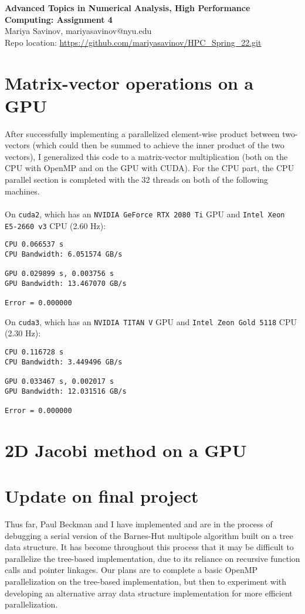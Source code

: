 \documentclass[10pt, letterpaper]{article}
\begin{document}
\begin{center}
{\bf
Advanced Topics in Numerical Analysis, High Performance Computing: \textbf{Assignment 4} \\
}
Mariya Savinov, mariyasavinov@nyu.edu\\
Repo location: \url{https://github.com/mariyasavinov/HPC_Spring_22.git}
\end{center}

\section{Matrix-vector operations on a GPU}
After successfully implementing a parallelized element-wise product between two-vectors (which could then be summed to achieve the inner product of the two vectors), I generalized this code to a matrix-vector multiplication (both on the CPU with OpenMP and on the GPU with CUDA). For the CPU part, the CPU parallel section is completed with the 32 threads on both of the following machines.\\\\
On {\tt cuda2}, which has an {\tt NVIDIA GeForce RTX 2080 Ti} GPU and {\tt Intel Xeon E5-2660 v3} CPU (2.60 Hz):
\begin{verbatim}
CPU 0.066537 s
CPU Bandwidth: 6.051574 GB/s

GPU 0.029899 s, 0.003756 s
GPU Bandwidth: 13.467070 GB/s

Error = 0.000000
\end{verbatim}
On {\tt cuda3}, which has an {\tt NVIDIA TITAN V} GPU and {\tt Intel Zeon Gold 5118} CPU (2.30 Hz):
\begin{verbatim}
CPU 0.116728 s
CPU Bandwidth: 3.449496 GB/s

GPU 0.033467 s, 0.002017 s
GPU Bandwidth: 12.031516 GB/s

Error = 0.000000
\end{verbatim}
\section{2D Jacobi method on a GPU}


\section{Update on final project}
Thus far, Paul Beckman and I have implemented and are in the process of debugging a serial version of the Barnes-Hut multipole algorithm built on a tree data structure. It has become throughout this process that it may be difficult to parallelize the tree-based implementation, due to its reliance on recursive function calls and pointer linkages. Our plans are to complete a basic OpenMP parallelization on the tree-based implementation, but then to experiment with developing an alternative array data structure implementation for more efficient parallelization.
\end{document}
